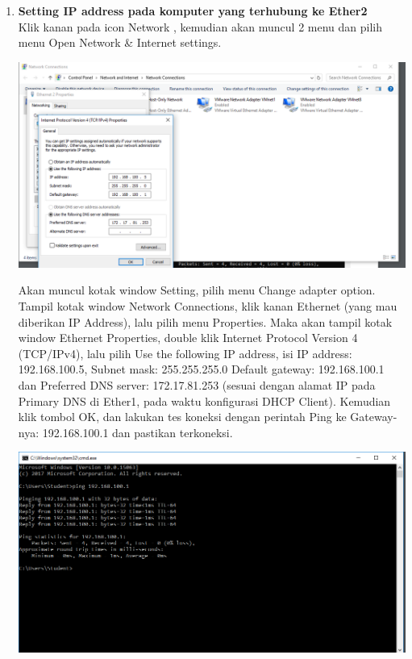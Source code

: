 \documentclass[a4paper,12pt]{article}
\begin{document}
\begin{enumerate}
	\item\textbf{Setting IP address pada komputer yang terhubung ke Ether2}\\
	Klik kanan pada icon Network , kemudian akan muncul 2 menu dan pilih menu
	Open Network \& Internet settings.
	\begin{center}
		\includegraphics[scale=.5]{Capture8}
	\end{center}
	Akan muncul kotak window Setting, pilih menu Change adapter option.
	Tampil kotak window Network Connections, klik kanan Ethernet (yang mau diberikan IP Address), lalu pilih menu Properties. Maka akan tampil kotak window Ethernet Properties, double klik Internet Protocol Version 4 (TCP/IPv4), lalu pilih Use the following IP address, isi IP address: 192.168.100.5, Subnet mask: 255.255.255.0 Default gateway:
	192.168.100.1 dan Preferred DNS server: 172.17.81.253 (sesuai dengan alamat IP pada Primary DNS di Ether1, pada waktu konfigurasi DHCP Client).
	Kemudian klik tombol OK, dan lakukan tes koneksi dengan perintah Ping ke Gateway-nya: 192.168.100.1 dan pastikan terkoneksi.
	\begin{center}
		\includegraphics[scale=.4]{Capture9}
	\end{center}
	

\end{enumerate}
\end{document}
